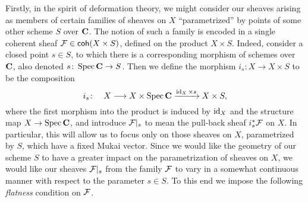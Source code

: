 Firstly, in the spirit of deformation theory, we might consider our sheaves arising as members of certain families of sheaves on $X$ ``parametrized'' by points of some other scheme $S$ over $\mathbf C$. The notion of such a family is encoded in a single coherent sheaf $\mathcal F \in \mathsf{coh}(X \times S)$, defined on the product $X \times S$. Indeed, consider a closed point $s \in S$, to which there is a corresponding morphism of schemes over $\mathbf C$, also denoted $s \colon \operatorname{Spec}\mathbf C \to S$. Then we define the morphism $i_s \colon X \to X \times S$ to be the composition
\begin{equation}
    \label{eq: inclusion of X to X x S}
    i_s \colon \quad X \longrightarrow X \times \operatorname{Spec}\mathbf C \xrightarrow{\operatorname{id}_{X} \times s} X \times S,
\end{equation}
where the first morphism into the product is induced by $\operatorname{id}_{X}$ and the structure map $X \to \operatorname{Spec}\mathbf C$, and introduce $\mathcal F|_s$ to mean the pull-back sheaf $i_s^*\mathcal F$ on $X$. In particular, this will allow us to focus only on those sheaves on $X$, parametrized by $S$, which have a fixed Mukai vector.
Since we would like the geometry of our scheme $S$ to have a greater impact on the parametrization of sheaves on $X$, we would like our sheaves $\mathcal F|_s$ from the family $\mathcal F$ to vary in a somewhat continuous manner with respect to the parameter $s \in S$. To this end we impose the following \emph{flatness} condition on $\mathcal F$. 





